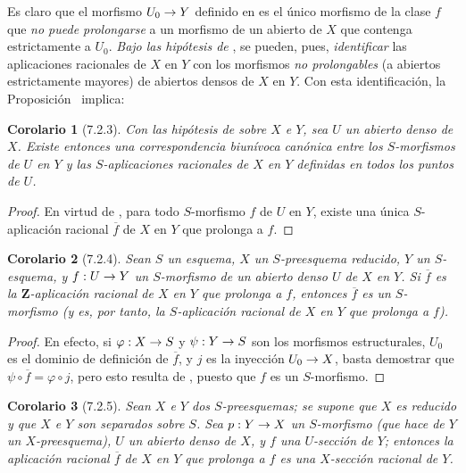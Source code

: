 \documentclass[oneside]{amsart}
\theoremstyle{ega-env-style}
\theoremstyle{ega-thm-env-style}
\newtheorem*{corollary}{Corolario}
\theoremstyle{ega-defn-env-style}
\renewcommand{\to}{\mathchoice{\longrightarrow}{\rightarrow}{\rightarrow}{\rightarrow}}
\let\EGAOriginalLabel\label
\renewcommand{\label}[1]{\phantomsection\EGAOriginalLabel{#1}}
\begin{document}
Es claro que el morfismo $U_0\to Y$ definido en  es el único morfismo de la clase $f$ que \emph{no puede prolongarse} a un morfismo de un abierto de $X$ que contenga estrictamente a $U_0$.
\emph{Bajo las hipótesis de} , se pueden, pues, \emph{identificar} las aplicaciones racionales de $X$ en $Y$ con los morfismos \emph{no prolongables} (a abiertos estrictamente mayores) de abiertos densos de $X$ en $Y$.
Con esta identificación, la Proposición~ implica:
\begin{corollary}[7.2.3]
\label{I.7.2.3}
Con las hipótesis de  sobre $X$ e $Y$, sea $U$ un abierto denso de $X$.
Existe entonces una correspondencia biunívoca canónica entre los $S$-morfismos de $U$ en $Y$ y las $S$-aplicaciones racionales de $X$ en $Y$ definidas en todos los puntos de $U$.
\end{corollary}

\begin{proof}
En virtud de , para todo $S$-morfismo $f$ de $U$ en $Y$, existe una única $S$-aplicación racional $\overline f$ de $X$ en $Y$ que prolonga a $f$.
\end{proof}

\begin{corollary}[7.2.4]
\label{I.7.2.4}
Sean $S$ un esquema, $X$ un $S$-preesquema reducido, $Y$ un $S$-esquema, y $f:U\to Y$ un $S$-morfismo de un abierto denso $U$ de $X$ en $Y$.
Si $\overline f$ es la $\mathbf{Z}$-aplicación racional de $X$ en $Y$ que prolonga a $f$, entonces $\overline f$ es un $S$-morfismo (y es, por tanto, la $S$-aplicación racional de $X$ en $Y$ que prolonga a $f$).
\end{corollary}

\begin{proof}
En efecto, si $\varphi:X\to S$ y $\psi:Y\to S$ son los morfismos estructurales, $U_0$ es el dominio de definición de $\overline f$, y $j$ es la inyección $U_0\to X$, basta demostrar que $\psi\circ\overline f=\varphi\circ j$, pero esto resulta de , puesto que $f$ es un $S$-morfismo.
\end{proof}

\begin{corollary}[7.2.5]
\label{I.7.2.5}
Sean $X$ e $Y$ dos $S$-preesquemas; se supone que $X$ es reducido y que $X$ e $Y$ son separados sobre $S$.
Sea $p:Y\to X$ un $S$-morfismo (que hace de $Y$ un $X$-preesquema), $U$ un abierto denso de $X$, y $f$ una $U$-sección de $Y$; entonces la aplicación racional $\overline f$ de $X$ en $Y$ que prolonga a $f$ es una $X$-sección racional de $Y$.
\end{corollary}
\end{document}
